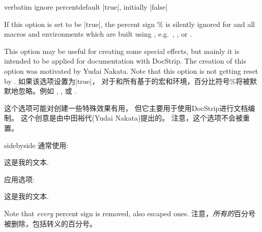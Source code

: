 \begin{docTcbKey}[][doc new=2017-07-05]{verbatim ignore percent}{}{default |true|, initially |false|}
\begin{stripedbox}
If this option is set to be |true|, the percent sign \% is silently
ignored for  and all macros and environments
which are built using , e.g.\ 
, , or .\par
This option may be useful for creating some special effects, but mainly
it is intended to be applied for documentation with DocStrip.
The creation of this option was motivated by Yudai Nakata.
Note that this option is not getting reset by .
\tcblower
如果该选项设置为|true|，%
对于和所有基于的宏和环境，百分比符号\%将被默默地忽略。例如 , , 或 .\par
这个选项可能对创建一些特殊效果有用，%
但它主要用于使用DocStrip进行文档编制。%
这个创意是由中田裕代(Yudai Nakata)提出的。%
注意，这个选项不会被重置。
\end{stripedbox}

\begin{dispExample*}{sidebyside}
通常使用:
\begin{tcbwritetemp}
这是我的文本.
\end{tcbwritetemp}

\tcbusetemp

\bigskip 应用选项:
\begin{tcbwritetemp}
这是我的文本.
\end{tcbwritetemp}

\tcbusetemp
\end{dispExample*}

\begin{marker}
\begin{stripedbox}
Note that \emph{every} percent sign is removed, also escaped ones.
\tcblower
注意，\emph{所有的}百分号被删除，包括转义的百分号。
\end{stripedbox}
\end{marker}


\end{docTcbKey}
